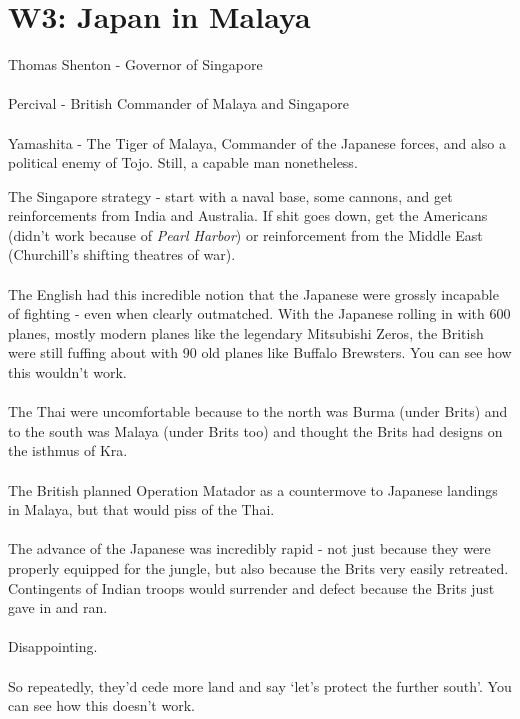 \documentclass[a4paper]{article}
\begin{document}
\section{W3: Japan in Malaya}
\begin{framed}
	\begin{displayquote}
		Thomas Shenton - Governor of Singapore\\
		\\
		Percival - British Commander of Malaya and Singapore\\
		\\
		Yamashita - The Tiger of Malaya, Commander of the Japanese forces, and also a political enemy of Tojo. Still, a capable man nonetheless.
	\end{displayquote}
\end{framed}

The Singapore strategy - start with a naval base, some cannons, and get reinforcements from India and Australia. If shit goes down, get the Americans (didn't work because of \textit{Pearl Harbor}) or reinforcement from the Middle East (Churchill's shifting theatres of war).\\ 
\\
The English had this incredible notion that the Japanese were grossly incapable of fighting - even when clearly outmatched. With the Japanese rolling in with 600 planes, mostly modern planes like the legendary Mitsubishi Zeros, the British were still fuffing about with 90 old planes like Buffalo Brewsters. You can see how this wouldn't work.\\
\\
The Thai were uncomfortable because to the north was Burma (under Brits) and to the south was Malaya (under Brits too) and thought the Brits had designs on the isthmus of Kra.\\
\\
The British planned Operation Matador as a countermove to Japanese landings in Malaya, but that would piss of the Thai.\\
\\
The advance of the Japanese was incredibly rapid - not just because they were properly equipped for the jungle, but also because the Brits very easily retreated. Contingents of Indian troops would surrender and defect because the Brits just gave in and ran.\\
\\
Disappointing.\\
\\
So repeatedly, they'd cede more land and say `let's protect the further south'. You can see how this doesn't work.
\end{document}
